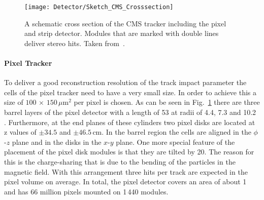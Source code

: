 \begin{figure}[Htb]
    \centering
    \texttt{[image: Detector/Sketch\_CMS\_Crosssection]}
    \caption[Schematic cross section of the CMS Tracker]{A schematic cross section of the CMS tracker including the pixel and strip detector. Modules that are marked with double lines deliver stereo hits. Taken from~. \label{plot:LHCCMSTrackerCrossCMS}}
\end{figure}

\paragraph*{Pixel Tracker}
To deliver a good reconstruction resolution of the track impact parameter the cells of the pixel tracker need to have a very small size. In order to achieve this a size of $\text{100}\,\times\,\text{150}\,\mu\text{m}^{\text{2}}$ per pixel is chosen. As can be seen in Fig.~\ref{plot:LHCCMSTrackerCrossCMS} there are three barrel layers of the pixel detector with a length of 53\cm{} at radii of 4.4, 7.3 and 10.2 \cm{}. Furthermore, at the end planes of these cylinders two pixel disks are located at z values of $\pm{}34.5$ and $\pm{}46.5\,\text{cm}$. In the barrel region the cells are aligned in the $\phi{}$-$z$ plane and in the disks in the $x$-$y$ plane. One more special feature of the placement of the pixel disk modules is that they are tilted by 20\de{}. The reason for this is the charge-sharing that is due to the bending of the particles in the magnetic field.  With this arrangement three hits per track are expected in the pixel volume on average. In total, the pixel detector covers an area of about 1\ms{} and has 66 million pixels mounted on 1\,440 modules.


